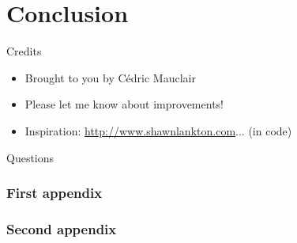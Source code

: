 \documentclass[pdflatex,compress,9pt,
	xcolor={dvipsnames,dvipsnames,svgnames,x11names,table},
	hyperref={colorlinks = true,breaklinks = true, urlcolor = NavyBlue, breaklinks = true}]{beamer}
\begin{document}
\section
  {Conclusion}

\begin{bibunit}[plain]
\begin{frame}
  {Credits}

  \begin{itemize}
  \item Brought to you by Cédric Mauclair
  \item Please let me know about improvements!
  \item Inspiration: \url{http://www.shawnlankton.com}... (in code)
  \end{itemize}

  \nocite{ipsum}
  

\end{frame}
\end{bibunit}

\begin{bibunit}[plain]
\begin{frame}
  {Questions}

  \nocite{lorem}
  

\end{frame}
\end{bibunit}


\appendix[Appendices]

\begin{frame}
  \frametitle{First appendix}
\end{frame}

\begin{frame}
  \frametitle{Second appendix}
\end{frame}
\end{document}
